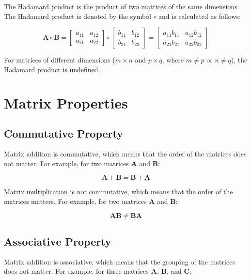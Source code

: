 \documentclass[11pt]{article}
\begin{document}
    The Hadamard product is the product of two matrices of the same dimensions. The Hadamard product is denoted by the symbol \( \circ \) and is calculated as follows:

   
    \[
\mathbf{A} \circ \mathbf{B} =
\begin{bmatrix}
a_{11} & a_{12} \\
a_{21} & a_{22}
\end{bmatrix}
\circ
\begin{bmatrix}
b_{11} & b_{12} \\
b_{21} & b_{22}
\end{bmatrix}
=
\begin{bmatrix}
a_{11} b_{11} & a_{12} b_{12} \\
a_{21} b_{21} & a_{22} b_{22}
\end{bmatrix}

\]

For matrices of different dimensions ($m \times n$ and $p \times q$, where $m \neq p$ or $n \neq q$), the Hadamard product is undefined.

\section{Matrix Properties}

    \subsection{Commutative Property}

    Matrix addition is commutative, which means that the order of the matrices does not matter. For example, for two matrices \( \mathbf{A} \) and \( \mathbf{B} \):

    \[
\mathbf{A} + \mathbf{B} = \mathbf{B} + \mathbf{A}
\]

    Matrix multiplication is not commutative, which means that the order of the matrices matters. For example, for two matrices \( \mathbf{A} \) and \( \mathbf{B} \):

    \[
\mathbf{A} \mathbf{B} \neq \mathbf{B} \mathbf{A}
\]

    \subsection{Associative Property}

    Matrix addition is associative, which means that the grouping of the matrices does not matter. For example, for three matrices \( \mathbf{A} \), \( \mathbf{B} \), and \( \mathbf{C} \):
\end{document}
